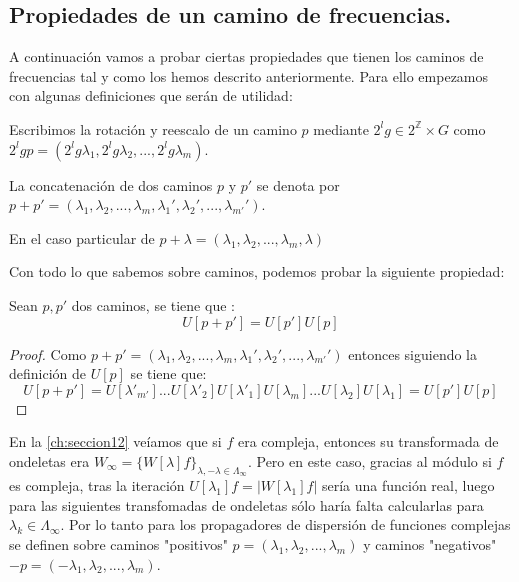 \subsection{Propiedades de un camino de frecuencias.}

\noindent A continuación vamos a probar ciertas propiedades que tienen los caminos de frecuencias tal y como los hemos descrito anteriormente. Para ello empezamos con algunas definiciones que serán de utilidad:

\begin{definicion}
Escribimos la rotación y reescalo de un camino $p$ mediante $2^lg \in 2^\mathbb{Z}\times G$ como $2^lgp=(2^lg\lambda_1,2^lg\lambda_2,...,2^lg\lambda_m)$.
\end{definicion}

\begin{definicion}
La concatenación de dos caminos $p$ y $p'$ se denota por $p+p'=(\lambda_1,\lambda_2,...,\lambda_m,\lambda_1',\lambda_2',...,\lambda_{m'}')$. 

En el caso particular de $p+\lambda=(\lambda_1,\lambda_2,...,\lambda_m,\lambda)$
\end{definicion}

\noindent Con todo lo que sabemos sobre caminos, podemos probar la siguiente propiedad: 

\begin{proposicion} \label{proposicionSumaCaminos}
Sean $p, p'$ dos caminos, se tiene que :
$$U[p+p']=U[p']U[p]$$
\end{proposicion}

\begin{proof}
Como $p+p'=(\lambda_1,\lambda_2,...,\lambda_m,\lambda_1',\lambda_2',...,\lambda_{m'}')$ entonces siguiendo la definición de $U[p]$ se tiene que: 
$$U[p+p']=U[\lambda'_{m'}]...U[\lambda'_2]U[\lambda'_1]U[\lambda_{m}]...U[\lambda_2]U[\lambda_1]=U[p']U[p]$$ \qedhere
\end{proof}

\medskip

\noindent En la \autoref{ch:seccion12} veíamos que si $f$ era compleja, entonces su transformada de ondeletas era $ W_\infty=\lbrace W[\lambda]f \rbrace_{\lambda , -\lambda  \in \Lambda_{\infty} }$. Pero en este caso, gracias al módulo si $f$ es compleja, tras la iteración $U[\lambda_1]f=\left|W[\lambda_1]f\right|$ sería una función real, luego para las siguientes transfomadas de ondeletas sólo haría falta calcularlas para $\lambda_k \in \Lambda_\infty$. Por lo tanto para los propagadores de dispersión de funciones complejas se definen sobre caminos "positivos" $p=(\lambda_1,\lambda_2, ... , \lambda_m)$ y caminos "negativos" $-p=(-\lambda_1,\lambda_2, ... , \lambda_m)$.

